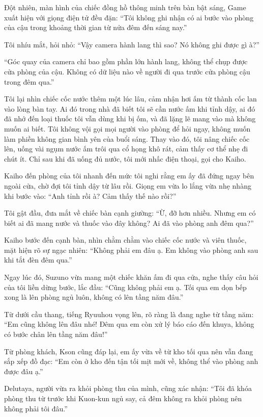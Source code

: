 \documentclass[../main.tex]{subfiles}
\begin{document}
Đột nhiên, màn hình của chiếc đồng hồ thông minh trên bàn bật sáng, Game xuất hiện với giọng điện tử đều đặn: ``Tôi không ghi nhận có ai bước vào phòng của cậu trong khoảng thời gian từ nửa đêm đến sáng nay.''

Tôi nhíu mắt, hỏi nhỏ: ``Vậy camera hành lang thì sao? Nó không ghi được gì à?''

``Góc quay của camera chỉ bao gồm phần lớn hành lang, không thể chụp được cửa phòng của cậu. Không có dữ liệu nào về người đi qua trước cửa phòng cậu trong đêm qua.''

Tôi lại nhìn chiếc cốc nước thêm một lúc lâu, cảm nhận hơi ấm từ thành cốc lan vào lòng bàn tay. Ai đó trong nhà đã biết tôi sẽ cần nước ấm khi tỉnh dậy, ai đó đã nhớ đến loại thuốc tôi vẫn dùng khi bị ốm, và đã lặng lẽ mang vào mà không muốn ai biết. Tôi không vội gọi mọi người vào phòng để hỏi ngay, không muốn làm phiền không gian bình yên của buổi sáng. Thay vào đó, tôi nâng chiếc cốc lên, uống vài ngụm nước ấm trôi qua cổ họng khô rát, cảm thấy cơ thể nhẹ đi chút ít. Chỉ sau khi đã uống đủ nước, tôi mới nhấc điện thoại, gọi cho Kaiho.

\ct

Kaiho đến phòng của tôi nhanh đến mức tôi nghi rằng em ấy đã đứng ngay bên ngoài cửa, chờ đợi tôi tỉnh dậy từ lâu rồi. Giọng em vừa lo lắng vừa nhẹ nhàng khi bước vào: ``Anh tỉnh rồi à? Cảm thấy thế nào rồi?''

Tôi gật đầu, đưa mắt về chiếc bàn cạnh giường: ``Ừ, đỡ hơn nhiều. Nhưng em có biết ai đã mang nước và thuốc vào đây không? Ai đã vào phòng anh đêm qua?''

Kaiho bước đến cạnh bàn, nhìn chằm chằm vào chiếc cốc nước và viên thuốc, mặt hiện rõ sự ngạc nhiên: ``Không phải em đâu ạ. Em không vào phòng anh sau khi tắt đèn đêm qua.''

Ngay lúc đó, Suzuno vừa mang một chiếc khăn ấm đi qua cửa, nghe thấy câu hỏi của tôi liền dừng bước, lắc đầu: ``Cũng không phải em ạ. Tối qua em dọn bếp xong là lên phòng ngủ luôn, không có lên tầng năm đâu.''

Từ dưới cầu thang, tiếng Ryuuhou vọng lên, rõ ràng là đang nghe từ tầng năm: ``Em cũng không lên đâu nhé! Đêm qua em còn xử lý báo cáo đến khuya, không có bước chân lên tầng năm đâu!''

Từ phòng khách, Kson cũng đáp lại, em ấy vừa về từ kho tối qua nên vẫn đang sắp xếp đồ đạc: ``Em còn ở kho đến tận tối mịt mới về, không thể vào phòng anh được đâu ạ.''

Delutaya, người vừa ra khỏi phòng thu của mình, cũng xác nhận: ``Tôi đã khóa phòng thu từ trước khi Kuon-kun ngủ say, cả đêm không ra khỏi phòng nên không phải tôi đâu.''
\end{document}

